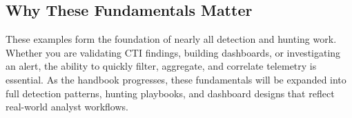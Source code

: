 
\subsection*{Why These Fundamentals Matter}

These examples form the foundation of nearly all detection and hunting work. Whether you are validating CTI findings, 
building dashboards, or investigating an alert, the ability to quickly filter, aggregate, and correlate telemetry is essential. 
As the handbook progresses, these fundamentals will be expanded into full detection patterns, hunting playbooks, 
and dashboard designs that reflect real-world analyst workflows.
